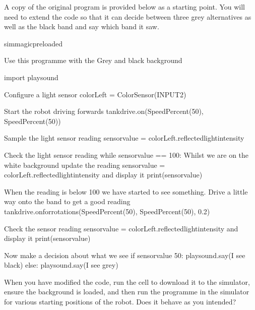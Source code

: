 \documentclass[letterpaper,10pt,english]{sphinxmanual}
\begin{document}
A copy of the original program is provided below as a starting point. You will need to extend the code so that it can decide between three grey alternatives as well as the black band and say which band it saw.

{
\begin{sphinxVerbatim}[commandchars=\\\{\}]
\llap{\color{nbsphinxin}[ ]:\,\hspace{\fboxrule}\hspace{\fboxsep}}\PYGZpc{}\PYGZpc{}sim\PYGZus{}magic\PYGZus{}preloaded

\PYGZsh{} Use this programme with the \PYGZdq{}Grey and black\PYGZdq{} background

import playsound

\PYGZsh{} Configure a light sensor
colorLeft = ColorSensor(INPUT\PYGZus{}2)

\PYGZsh{} Start the robot driving forwards
tank\PYGZus{}drive.on(SpeedPercent(50), SpeedPercent(50))

\PYGZsh{}Sample the light sensor reading
sensor\PYGZus{}value = colorLeft.reflected\PYGZus{}light\PYGZus{}intensity

\PYGZsh{}Check the light sensor reading
while sensor\PYGZus{}value == 100:
    \PYGZsh{} Whilst we are on the white background
    \PYGZsh{} update the reading
    sensor\PYGZus{}value = colorLeft.reflected\PYGZus{}light\PYGZus{}intensity
    \PYGZsh{} and display it
    print(sensor\PYGZus{}value)

\PYGZsh{} When the reading is below 100
\PYGZsh{} we have started to see something.
\PYGZsh{} Drive a little way onto the band to get a good reading
tank\PYGZus{}drive.on\PYGZus{}for\PYGZus{}rotations(SpeedPercent(50), SpeedPercent(50), 0.2)

\PYGZsh{}Check the sensor reading
sensor\PYGZus{}value = colorLeft.reflected\PYGZus{}light\PYGZus{}intensity
\PYGZsh{} and display it
print(sensor\PYGZus{}value)

\PYGZsh{} Now make a decision about what we see
if sensor\PYGZus{}value \PYGZlt{} 50:
    playsound.say(\PYGZdq{}I see black\PYGZdq{})
else:
    playsound.say(\PYGZdq{}I see grey\PYGZdq{})
\end{sphinxVerbatim}
}

When you have modified the code, run the cell to download it to the simulator, ensure the  background is loaded, and then run the programme in the simulator for various starting positions of the robot. Does it behave as you intended?
\end{document}
